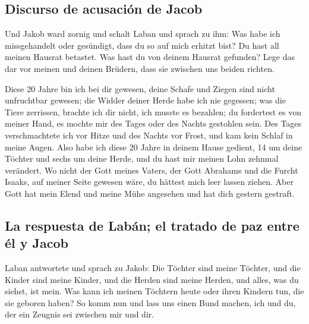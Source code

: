 \hypertarget{discurso-de-acusaciuxf3n-de-jacob}{%
\subsection{Discurso de acusación de
Jacob}\label{discurso-de-acusaciuxf3n-de-jacob}}

 Und Jakob ward zornig und schalt Laban und sprach zu
ihm: Was habe ich missgehandelt oder gesündigt, dass du so auf mich
erhitzt bist?  Du hast all meinen Hausrat betastet. Was
hast du von deinem Hausrat gefunden? Lege das dar vor meinen und deinen
Brüdern, dass sie zwischen uns beiden richten.

 Diese 20 Jahre bin ich bei dir gewesen, deine Schafe und
Ziegen sind nicht unfruchtbar gewesen; die Widder deiner Herde habe ich
nie gegessen;  was die Tiere zerrissen, brachte ich dir
nicht, ich musste es bezahlen; du fordertest es von meiner Hand, es
mochte mir des Tages oder des Nachts gestohlen sein.  Des
Tages verschmachtete ich vor Hitze und des Nachts vor Frost, und kam
kein Schlaf in meine Augen.  Also habe ich diese 20 Jahre
in deinem Hause gedient, 14 um deine Töchter und sechs um deine Herde,
und du hast mir meinen Lohn zehnmal verändert.  Wo nicht
der Gott meines Vaters, der Gott Abrahams und die Furcht Isaaks, auf
meiner Seite gewesen wäre, du hättest mich leer lassen ziehen. Aber Gott
hat mein Elend und meine Mühe angesehen und hat dich gestern gestraft.

\hypertarget{la-respuesta-de-labuxe1n-el-tratado-de-paz-entre-uxe9l-y-jacob}{%
\subsection{La respuesta de Labán; el tratado de paz entre él y
Jacob}\label{la-respuesta-de-labuxe1n-el-tratado-de-paz-entre-uxe9l-y-jacob}}

 Laban antwortete und sprach zu Jakob: Die Töchter sind
meine Töchter, und die Kinder sind meine Kinder, und die Herden sind
meine Herden, und alles, was du siehst, ist mein. Was kann ich meinen
Töchtern heute oder ihren Kindern tun, die sie geboren haben?
 So komm nun und lass uns einen Bund machen, ich und du,
der ein Zeugnis sei zwischen mir und dir.

